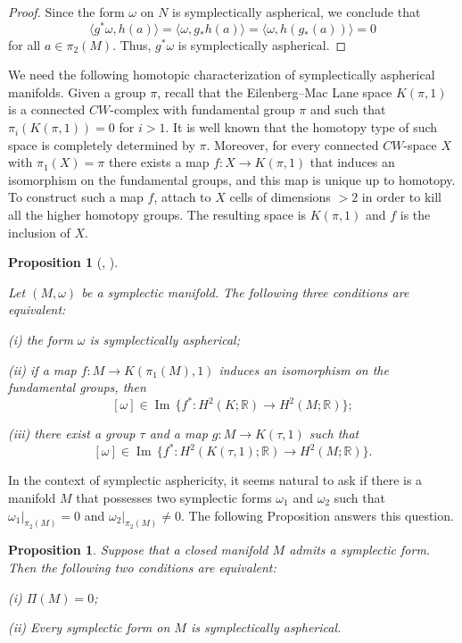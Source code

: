\documentclass[12pt]{amsart}
\newcommand{\B}[1]{{\mathbb #1}}
\newcommand\R{\B R}
\newtheorem{prop}[subsection]{Proposition}
\numberwithin{equation}{section}
\theoremstyle{definition}
\theoremstyle{remark}
\numberwithin{figure}{section}
\numberwithin{table}{section}
\def\Im{\operatorname{Im}}
\newcommand{\ms}{{\medskip}}
\begin{document}
\begin{proof} Since the form $\omega$ on $N$ is symplectically aspherical, we  
conclude  
that 
$$ 
\langle g^*\omega, h(a)\rangle=\langle\omega, g_*h(a)\rangle= 
\langle\omega, h(g_*(a))\rangle=0 
$$ 
for all $a\in \pi_2(M)$. Thus, $g^*\omega$ is symplectically aspherical. 
\end{proof}  
 
 
\ms We need the following homotopic characterization of symplectically 
aspherical manifolds. Given a group $\pi$, recall that the Eilenberg--Mac Lane  
space $K(\pi,1)$ is  a connected $CW$-complex with fundamental  
group $\pi$ and such that $\pi_i(K(\pi,1))=0$ for $i>1$. It is well known  that  
the homotopy type of such space is completely determined by
$\pi$. Moreover, for every connected $CW$-space $X$ with $\pi_1(X)=\pi$ there
exists a map $f: X\to K(\pi,1)$ that induces an isomorphism on the
fundamental groups, and this map is unique up to homotopy. To
construct such a map $f$, attach to $X$ cells of dimensions $>2$ in
order to kill all the higher homotopy groups. The resulting space is
$K(\pi,1)$ and $f$ is the inclusion of $X$. 
 
 
\begin{prop}[{\rm  \cite[Lemma 4.2]{LO}, \cite[Corollary 2.2]{RT}}] 
\label{p:aspher} 
 
Let $(M,\omega)$ be a symplectic manifold.  
The following three  
conditions are equivalent: 
 
\par {\rm (i)} the form $\omega$ is symplectically aspherical;  
 
\par {\rm (ii)} if a map $f: M\to K(\pi_1(M),1)$ induces an  
isomorphism on the fundamental groups, then 
$$  
[\omega]\in\Im\,\{f^*: H^2(K;\R)\to H^2(M;\R)\}; 
$$ 
 
\par {\rm (iii)} there exist a group $\tau$ and a map $g: M\to
K(\tau,1)$ such that  
$$  
[\omega]\in\Im\,\{f^*: H^2(K(\tau,1);\R)\to H^2(M;\R)\}. 
$$ 
\end{prop} 
 
 
 
\ms In the context of symplectic asphericity, it seems natural to ask if there  
is a manifold $M$ that possesses two symplectic forms $\omega_1$ and $\omega_2$  
such that $\omega_1|_{\pi_2(M)}=0$ and $\omega_2|_{\pi_2(M)} \ne 0$. The 
following  
Proposition answers this question. 
 
\begin{prop} Suppose that a closed manifold $M$ admits a symplectic form. Then 
the  
following two conditions are equivalent: 
 
\par{\rm (i)} $\Pi(M)=0$; 
 
\par{\rm (ii)} Every symplectic form on $M$ is symplectically aspherical. 
\end{prop} 
 
\end{document}
